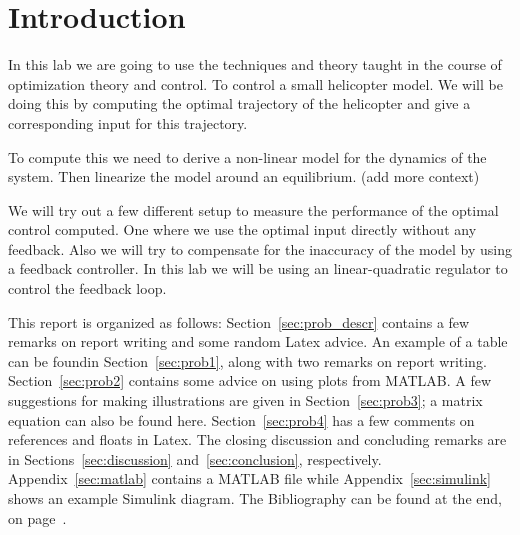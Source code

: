 \section{Introduction}
In this lab we are going to use the techniques and theory taught in the course of optimization theory and control. To control a small helicopter model. We will be doing this by computing the optimal trajectory of the helicopter and give a corresponding input for this trajectory.

To compute this we need to derive a non-linear model for the dynamics of the system. Then linearize the model around an equilibrium. (add more context)

We will try out a few different setup to measure the performance of the optimal control computed. One where we use the optimal input directly without any feedback. Also we will try to compensate for the inaccuracy of the model by using a feedback controller. In this lab we will be using an linear-quadratic regulator to control the feedback loop.


This report is organized as follows: Section~\ref{sec:prob_descr} contains a few remarks on report writing and some random Latex advice. An example of a table can be foundin Section~\ref{sec:prob1}, along with two remarks on report writing. Section~\ref{sec:prob2} contains some advice on using plots from MATLAB. A few suggestions for making illustrations are given in Section~\ref{sec:prob3}; a matrix equation can also be found here. Section~\ref{sec:prob4} has a few comments on references and floats in Latex. The closing discussion and concluding remarks are in Sections~\ref{sec:discussion} and~\ref{sec:conclusion}, respectively. Appendix~\ref{sec:matlab} contains a MATLAB file while Appendix~\ref{sec:simulink} shows an example Simulink diagram. The Bibliography can be found at the end, on page~\pageref{sec:bibliography}.